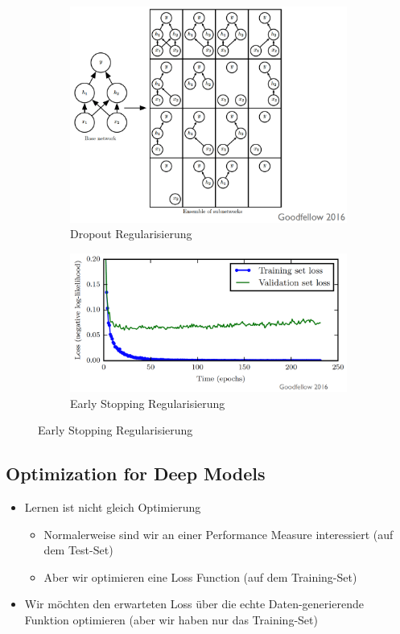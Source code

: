 \documentclass[a4paper]{article}
\begin{document}
		\begin{figure}[htb!]
			\centering
			\begin{subfigure}[b]{0.475\textwidth}
				\centering
				\includegraphics[width=\textwidth]{img/06_deep_nn/dropout.png}
				\caption{Dropout Regularisierung}
			\end{subfigure}
			\hfill
			\begin{subfigure}[b]{0.475\textwidth}
				\centering
				\includegraphics[width=\textwidth]{img/06_deep_nn/early_stopping.png}
				\caption{Early Stopping Regularisierung}
			\end{subfigure}
		\end{figure}
		
		\subsection{Optimization for Deep Models}
		
		\begin{itemize}
			\item Lernen ist nicht gleich Optimierung
				\begin{itemize}
					\item Normalerweise sind wir an einer Performance Measure interessiert (auf dem Test-Set)
					\item Aber wir optimieren eine Loss Function (auf dem Training-Set)
				\end{itemize}
			\item Wir möchten den erwarteten Loss über die echte Daten-generierende Funktion optimieren (aber wir haben nur das Training-Set)
		\end{itemize}
	
\end{document}
